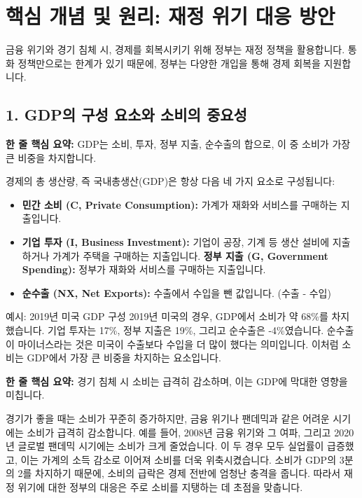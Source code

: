 \documentclass[11pt,a4paper]{article}
\theoremstyle{definition}
\begin{document}
\newpage
\section{핵심 개념 및 원리: 재정 위기 대응 방안}

금융 위기와 경기 침체 시, 경제를 회복시키기 위해 정부는 재정 정책을 활용합니다. 통화 정책만으로는 한계가 있기 때문에, 정부는 다양한 개입을 통해 경제 회복을 지원합니다.

\subsection{1. GDP의 구성 요소와 소비의 중요성}

\begin{tcolorbox}[mybox={GDP의 구성 요소}]
    \textbf{한 줄 핵심 요약:} GDP는 소비, 투자, 정부 지출, 순수출의 합으로, 이 중 소비가 가장 큰 비중을 차지합니다.
\end{tcolorbox}

경제의 총 생산량, 즉 국내총생산(GDP)은 항상 다음 네 가지 요소로 구성됩니다:
\begin{itemize}
    \item \textbf{민간 소비 (C, Private Consumption):} 가계가 재화와 서비스를 구매하는 지출입니다.
    \item \textbf{기업 투자 (I, Business Investment):} 기업이 공장, 기계 등 생산 설비에 지출하거나 가계가 주택을 구매하는 지출입니다.
    \textbf{정부 지출 (G, Government Spending):} 정부가 재화와 서비스를 구매하는 지출입니다.
    \item \textbf{순수출 (NX, Net Exports):} 수출에서 수입을 뺀 값입니다. (수출 - 수입)
\end{itemize}

\begin{examplebox}{예시: 2019년 미국 GDP 구성}
    2019년 미국의 경우, GDP에서 소비가 약 68\%를 차지했습니다. 기업 투자는 17\%, 정부 지출은 19\%, 그리고 순수출은 -4\%였습니다. 순수출이 마이너스라는 것은 미국이 수출보다 수입을 더 많이 했다는 의미입니다. 이처럼 소비는 GDP에서 가장 큰 비중을 차지하는 요소입니다.
\end{examplebox}

\begin{tcolorbox}[mybox={경기 침체 시 소비의 변화}]
    \textbf{한 줄 핵심 요약:} 경기 침체 시 소비는 급격히 감소하며, 이는 GDP에 막대한 영향을 미칩니다.
\end{tcolorbox}

경기가 좋을 때는 소비가 꾸준히 증가하지만, 금융 위기나 팬데믹과 같은 어려운 시기에는 소비가 급격히 감소합니다. 예를 들어, 2008년 금융 위기와 그 여파, 그리고 2020년 글로벌 팬데믹 시기에는 소비가 크게 줄었습니다. 이 두 경우 모두 실업률이 급증했고, 이는 가계의 소득 감소로 이어져 소비를 더욱 위축시켰습니다. 소비가 GDP의 3분의 2를 차지하기 때문에, 소비의 급락은 경제 전반에 엄청난 충격을 줍니다. 따라서 재정 위기에 대한 정부의 대응은 주로 소비를 지탱하는 데 초점을 맞춥니다.
\end{document}
